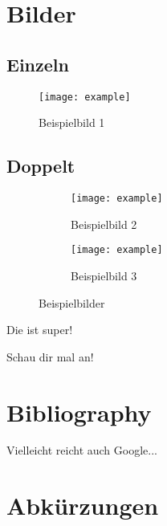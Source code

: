 \chapter{Bilder} \label{sec:pictures}

\section{Einzeln}

\begin{figure}[H]
    \begin{center} 
        \texttt{[image: example]}
        \caption{Beispielbild 1}
        \label{fig:example-1}
    \end{center}
\end{figure}

\newpage

\section{Doppelt}

\begin{figure}[H]
    \begin{center} 
    \begin{subfigure}[b]{0.48\linewidth}
        \texttt{[image: example]}
        \caption{Beispielbild 2}
        \label{fig:example-2}
    \end{subfigure}
    \begin{subfigure}[b]{0.48\linewidth}
        \texttt{[image: example]}
        \caption{Beispielbild 3}
        \label{fig:example-3}
    \end{subfigure}
    \caption{Beispielbilder}
    \label{fig:examples}
    \end{center}
\end{figure}

Die  ist super!

Schau dir mal  an!

\chapter{Bibliography}

\cite[vgl.][]{example-book}

\cite[][ein Bild]{example-online}

Vielleicht reicht auch Google...

\chapter{Abkürzungen}


